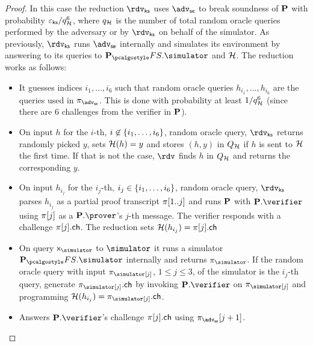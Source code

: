 \documentclass[runningheads,11pt]{llncs}
\theoremstyle{definition}
\begin{document}
\begin{proof}
In this case the reduction $\rdvks$ uses $\advse$ to break soundness of $\mathbf{P}$ with probability $\varepsilon_{\mathsf{ks}} / q_{\mathcal{H}}^6$, where $q_{\mathcal{H}}$ is the number of total random oracle queries performed by the adversary or by $\rdvks$ on behalf of the simulator.
As previously, $\rdvks$ runs $\advse$ internally and simulates its environment by answering to its queries to $\plonkprotfs.\simulator$ and $\mathcal{H}$. The reduction works as follows:
\begin{itemize}
\item It guesses indices $i_1, \ldots, i_6$ such that random oracle queries $h_{i_1}, \ldots, h_{i_6}$ are the queries used in $\zkproof_\advse$. This is done with probability at least $1/q_{\mathcal{H}}^6$ (since there are $6$ challenges from the verifier in $\mathbf{P}$).
	\item On input $h$ for the $i$-th, $i \not\in \{{i_1}, \ldots, {i_6}\}$, random
    oracle query, $\rdvks$ returns randomly picked $
    y$, sets $\mathcal{H}(h) = y $ and stores $(h, y)$ in $Q_{\mathcal{H}}$ if $h$ is sent to $\mathcal{H}$ the first time. If that is not the case, $\rdv$ finds $h$ in $Q_{\mathcal{H}}$ and returns the corresponding $y$.
	\item On input $h_{i_j}$ for the $i_j$-th, $i_j \in \{{i_1}, \ldots, {i_6}\}$,
    random oracle query, $\rdvks$ parses $h_{i_j}$ as a partial proof transcript
    $\pi[1..j]$ and runs $\mathbf{P}$ with $\plonkprot.\verifier$ using $\pi[j]$ as a $\plonkprot.\prover$'s $j$-th message. The verifier responds with a challenge $\pi[j].\mathsf{ch}$. The reduction sets $\mathcal{H}(h_{i_j}) = \pi[j].\mathsf{ch}$
	\item On query $\inp_\simulator$ to $\simulator$ it runs a simulator
    $\plonkprotfs.\simulator$ internally and returns $\zkproof_\simulator$. If
    the random oracle query with input $\zkproof_\simulator[j]$, $1 \leq j \leq 3$, of the simulator is the $i_j$-th query,
    generate $\zkproof_\simulator[j].\ch$ by invoking $\plonkprot.\verifier$ on
    $\zkproof_\simulator[j]$ and programming $\ro(h_{i_j}) = \zkproof_\simulator[j].\ch$.
	\item Answers $\plonkprot.\verifier$'s challenge $\pi[j].\mathsf{ch}$ using
    $\zkproof_\advse[j + 1]$.
\end{itemize}


\end{proof}
\end{document}
